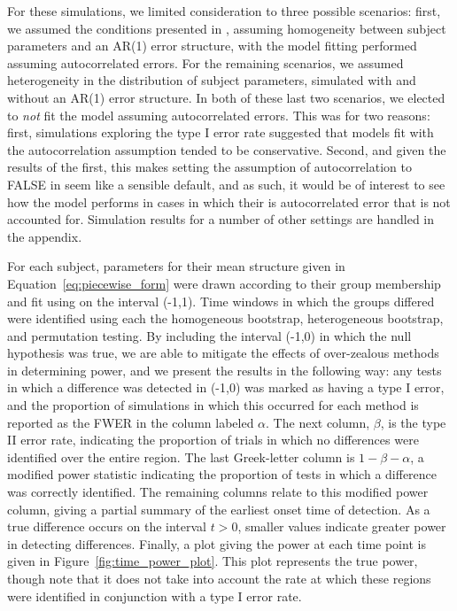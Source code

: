 For these simulations, we limited consideration to three possible scenarios: first, we assumed the conditions presented in \citet{oleson2017detecting}, assuming homogeneity between subject parameters and an AR(1) error structure, with the model fitting performed assuming autocorrelated errors. For the remaining scenarios, we assumed heterogeneity in the distribution of subject parameters, simulated with and without an AR(1) error structure. In both of these last two scenarios, we elected to \textit{not} fit the model assuming autocorrelated errors. This was for two reasons: first, simulations exploring the type I error rate suggested that models fit with the autocorrelation assumption tended to be conservative. Second, and given the results of the first, this makes setting the assumption of autocorrelation to FALSE in  seem like a sensible default, and as such, it would be of interest to see how the model performs in cases in which their is autocorrelated error that is not accounted for. Simulation results for a number of other settings are handled in the appendix. 

For each subject, parameters for their mean structure given in Equation~\ref{eq:piecewise_form} were drawn according to their group membership and fit using  on the interval (-1,1). Time windows in which the groups differed were identified using each the homogeneous bootstrap, heterogeneous bootstrap, and permutation testing. By including the interval (-1,0) in which the null hypothesis was true, we are able to mitigate the effects of over-zealous methods in determining power, and we present the results in the following way: any tests in which a difference was detected in (-1,0) was marked as having a type I error, and the proportion of simulations in which this occurred for each method is reported as the FWER in the column labeled $\alpha$. The next column, $\beta$, is the type II error rate, indicating the proportion of trials in which no differences were identified over the entire region. The last Greek-letter column is $1 - \beta - \alpha$, a modified power statistic indicating the proportion of tests in which a difference was correctly identified. The remaining columns relate to this modified power column, giving a partial summary of the earliest onset time of detection. As a true difference occurs on the interval $t > 0$, smaller values indicate greater power in detecting differences. Finally, a plot giving the power at each time point is given in Figure~\ref{fig:time_power_plot}. This plot represents the true power, though note that it does not take into account the rate at which these regions were identified in conjunction with a type I error rate. 


